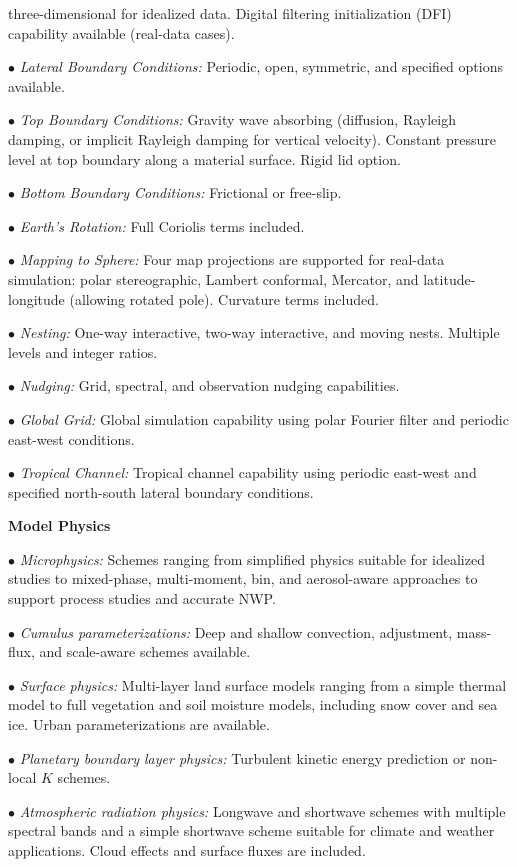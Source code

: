 \begin{description}
three-dimensional for idealized data. 
Digital filtering initialization (DFI) capability 
available (real-data cases).
%
\item{$\bullet$} {\em Lateral Boundary Conditions:} 
Periodic, open, symmetric, and specified options available.
%
\item{$\bullet$} {\em Top Boundary Conditions:} 
Gravity wave absorbing (diffusion, Rayleigh damping, or implicit 
Rayleigh damping for vertical velocity).  
Constant pressure level at top boundary along a material surface. 
Rigid lid option.
%
\item{$\bullet$} {\em Bottom Boundary Conditions:} 
Frictional or free-slip.
%
\item{$\bullet$} {\em Earth's Rotation:}
Full Coriolis terms included.
%
\item{$\bullet$} {\em Mapping to Sphere:} 
Four map projections are supported for real-data simulation: 
polar stereographic, Lambert conformal, Mercator, and 
latitude-longitude (allowing rotated pole). 
Curvature terms included.
%
\item{$\bullet$} {\em Nesting:} 
One-way interactive, two-way interactive, and moving nests.
Multiple levels and integer ratios.
%
\item{$\bullet$} {\em Nudging:}
Grid, spectral, and observation nudging capabilities. 
%
\item{$\bullet$} {\em Global Grid:}
Global simulation capability using polar Fourier filter and 
periodic east-west conditions. 
%
\item{$\bullet$} {\em Tropical Channel:}
Tropical channel capability using periodic east-west and specified north-south 
lateral boundary conditions.
\end{description}

\vskip 12pt
{\noindent\bf Model Physics}
\vskip 12pt

\begin{description}
\setlength{\itemsep}{-5pt}
\item{$\bullet$} {\em Microphysics:} Schemes ranging from simplified
physics suitable for idealized studies to mixed-phase, multi-moment, bin, and aerosol-aware
approaches to support process studies and accurate NWP.
%
\item{$\bullet$} {\em Cumulus parameterizations:}
Deep and shallow convection, adjustment, mass-flux, and scale-aware schemes available.
%
\item{$\bullet$} {\em Surface physics:}
Multi-layer land surface models ranging from a simple thermal model to full
vegetation and soil moisture models, including snow cover and sea ice.  Urban parameterizations are available.
%
\item{$\bullet$} {\em Planetary boundary layer physics:}
Turbulent kinetic energy prediction or non-local $K$ schemes.
%
\item{$\bullet$} {\em Atmospheric radiation physics:} 
Longwave and shortwave schemes with multiple spectral bands and a 
simple shortwave scheme suitable for climate and weather applications.  
Cloud effects and surface fluxes are included.
\end{description}

